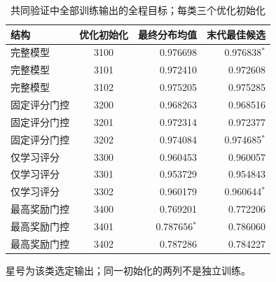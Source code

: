 \begin{table}[!htbp]
\centering\small
\caption{共同验证中全部训练输出的全程目标；每类三个优化初始化}
\label{tab:w2-training-repeats}
\begin{tabular}{lcrr}
\toprule
结构 & 优化初始化 & 最终分布均值 & 末代最佳候选 \\
\midrule
完整模型 & 3100 & 0.976698 & 0.976838$^*$ \\
完整模型 & 3101 & 0.972410 & 0.972608 \\
完整模型 & 3102 & 0.975205 & 0.975285 \\
固定评分门控 & 3200 & 0.968263 & 0.968516 \\
固定评分门控 & 3201 & 0.972314 & 0.972377 \\
固定评分门控 & 3202 & 0.974084 & 0.974685$^*$ \\
仅学习评分 & 3300 & 0.960453 & 0.960057 \\
仅学习评分 & 3301 & 0.953729 & 0.954843 \\
仅学习评分 & 3302 & 0.960179 & 0.960644$^*$ \\
最高奖励门控 & 3400 & 0.769201 & 0.772206 \\
最高奖励门控 & 3401 & 0.787656$^*$ & 0.786060 \\
最高奖励门控 & 3402 & 0.787286 & 0.784227 \\
\bottomrule
\end{tabular}
\par\smallskip\footnotesize 星号为该类选定输出；同一初始化的两列不是独立训练。
\par{}
\end{table}
